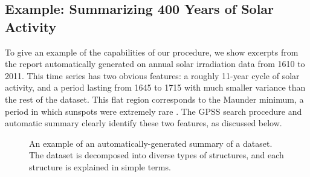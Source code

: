 \documentclass{article} %
\begin{document}
\subsection{Example: Summarizing 400 Years of Solar Activity}
\label{sec:example}
\vspace{-0.1in}

To give an example of the capabilities of our procedure, we show excerpts from the report automatically generated on annual solar irradiation data from 1610 to 2011.  This time series has two obvious features: a roughly 11-year cycle of solar activity, and a period lasting from 1645 to 1715 with much smaller variance than the rest of the dataset.  This flat region corresponds to the Maunder minimum, a period in which sunspots were extremely rare \citep{lean1995reconstruction}.
%
The GPSS search procedure and automatic summary clearly identify these two features, as discussed below.



\begin{figure}[h!]
\centering
{}
\caption{
An example of an automatically-generated summary of a dataset.  The dataset is decomposed into diverse types of structures, and each structure is explained in simple terms.}
\label{fig:exec}
\end{figure}
\end{document}
